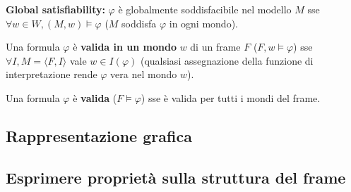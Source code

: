 \textbf{Global satisfiability:} $\varphi$ è globalmente soddisfacibile nel modello $M$ sse $\forall w \in W, (M, w) \models \varphi$ ($M$ soddisfa $\varphi$ in ogni mondo).

Una formula $\varphi$ è \textbf{valida in un mondo} $w$ di un frame $F$ ($F, w \models \varphi$) sse $\forall I, M = \langle F, I \rangle$ vale $w \in I(\varphi)$ (qualsiasi assegnazione della funzione di interpretazione rende $\varphi$ vera nel mondo $w$).

Una formula $\varphi$ è \textbf{valida} ($F \models \varphi$) sse è valida per tutti i mondi del frame.

\subsection{Rappresentazione grafica}

\subsection{Esprimere proprietà sulla struttura del frame}